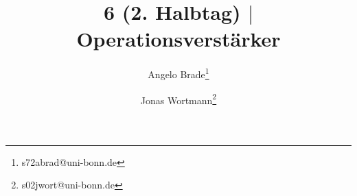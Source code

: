 \documentclass[a4paper,10pt]{article}
\numberwithin{equation}{section}
\begin{document}

\begin{titlepage}
	\title{6 (2. Halbtag) $|$ Operationsverstärker}
	\author[1]{Angelo Brade\thanks{s72abrad@uni-bonn.de}}
	\author[1]{Jonas Wortmann\thanks{s02jwort@uni-bonn.de}}
\end{titlepage}

\maketitle
{}


\clearpage


\fancyhead[R]{\leftmark}
\fancyhead[L]{\thepage}
\fancyfoot[C]{}

\tableofcontents


\clearpage


\end{document}
